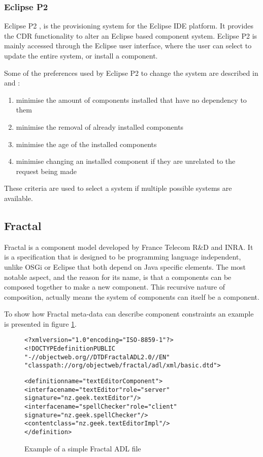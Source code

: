 \subsubsection{Eclipse P2}
Eclipse P2 \citep{le_berre_dependency_2009}, \citep{leBerre2010} is the provisioning system for the Eclipse IDE platform.
It provides the CDR functionality to alter an Eclipse based component system. 
Eclipse P2 is mainly accessed through the Eclipse user interface, where the user can select to update the entire system, or install a component.

Some of the preferences used by Eclipse P2 to change the system are described in \citep{le_berre_dependency_2009} and \citep{leBerre2010}:
\begin{enumerate}
  \item minimise the amount of components installed that have no dependency to them 
  \item minimise the removal of already installed components
  \item minimise the age of the installed components
  \item minimise changing an installed component if they are unrelated to the request being made
\end{enumerate} 

These criteria are used to select a system if multiple possible systems are available. 

\subsection{Fractal}
Fractal \citep{Quma2006} is a component model developed by France Telecom R\&D and INRA.
It is a specification that is designed to be programming language independent, unlike OSGi or Eclipse that both depend on Java specific elements.
The most notable aspect, and the reason for its name, is that a components can be composed together to make a new component.
This recursive nature of composition, actually means the system of components can itself be a component.

To show how Fractal meta-data can describe component constraints an example is presented in figure \ref{fractalmetadata}.

\begin{figure}[htp]
\begin{center}
\begin{alltt}
<?xml version="1.0" encoding="ISO-8859-1" ?>
<!DOCTYPE definition PUBLIC 
    "-//objectweb.org//DTD Fractal ADL 2.0//EN" 
    "classpath://org/objectweb/fractal/adl/xml/basic.dtd">

<definition name="textEditorComponent">
  <interface name="textEditor" role = "server" 
   signature = "nz.geek.textEditor"/>
  <interface name="spellChecker" role = "client" 
   signature = "nz.geek.spellChecker"/>
  <content class="nz.geek.textEditorImpl"/>
</definition>
\end{alltt}
  \caption[Fractal ADL Example]{Example of a simple Fractal ADL file}
  \label{fractalmetadata}
\end{center}
\end{figure}

